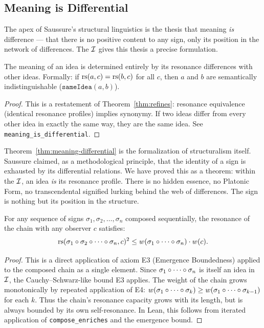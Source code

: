 \subsection{Meaning is Differential}

The apex of Saussure's structural linguistics is the thesis that
meaning \emph{is} difference --- that there is no positive content to
any sign, only its position in the network of differences. The $\mathcal{I}$
gives this thesis a precise formulation.

\begin{theorem}
\label{thm:meaning-differential}
The meaning of an idea is determined entirely by its resonance
differences with other ideas. Formally: if $\mathrm{rs}(a, c) = \mathrm{rs}(b, c)$
for all $c$, then $a$ and $b$ are semantically indistinguishable
($\texttt{sameIdea}(a, b)$).
\end{theorem}

\begin{proof}
This is a restatement of Theorem~\ref{thm:refines}: resonance
equivalence (identical resonance profiles) implies synonymy. If two
ideas differ from every other idea in exactly the same way, they are
the same idea. See \texttt{meaning\_is\_differential}.
\end{proof}

\begin{interpretation}
Theorem~\ref{thm:meaning-differential} is the formalization of
structuralism itself. Saussure claimed, as a methodological
principle, that the identity of a sign is exhausted by its
differential relations. We have proved this as a theorem: within
the $\mathcal{I}$, an idea \emph{is} its resonance profile. There is no
hidden essence, no Platonic Form, no transcendental signified
lurking behind the web of differences. The sign is nothing but its
position in the structure.
\end{interpretation}

\begin{theorem}
\label{thm:sign-chain-bound}
For any sequence of signs $\sigma_1, \sigma_2, \ldots, \sigma_n$ composed sequentially, the resonance of the chain with any observer $c$ satisfies:
\[
  \mathrm{rs}(\sigma_1 \circ \sigma_2 \circ \cdots \circ \sigma_n, c)^2 \leq w(\sigma_1 \circ \cdots \circ \sigma_n) \cdot w(c).
\]
\end{theorem}

\begin{proof}
This is a direct application of axiom E3 (Emergence Boundedness) applied to the composed chain as a single element. Since $\sigma_1 \circ \cdots \circ \sigma_n$ is itself an idea in $\mathcal{I}$, the Cauchy--Schwarz-like bound E3 applies. The weight of the chain grows monotonically by repeated application of E4: $w(\sigma_1 \circ \cdots \circ \sigma_k) \geq w(\sigma_1 \circ \cdots \circ \sigma_{k-1})$ for each $k$. Thus the chain's resonance capacity grows with its length, but is always bounded by its own self-resonance. In Lean, this follows from iterated application of \texttt{compose\_enriches} and the emergence bound.
\end{proof}

